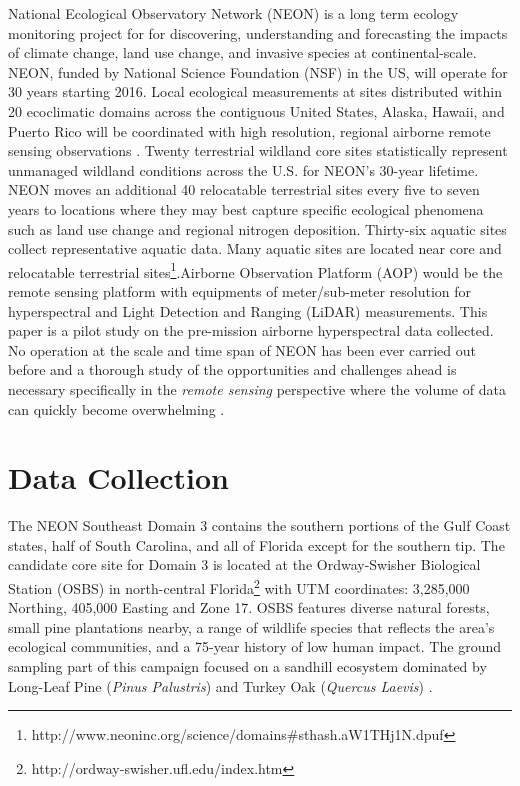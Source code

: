\documentclass[remotesensing,article,accept,moreauthors,pdftex,12pt,a4paper]{mdpi}
\begin{document}
National Ecological Observatory Network (NEON) is a long term ecology monitoring project for for discovering, understanding and forecasting the impacts of climate change, land use change, and invasive species at continental-scale. NEON, funded by National Science Foundation (NSF) in the US, will operate for 30 years starting 2016. Local ecological measurements at sites distributed within 20 ecoclimatic domains across the contiguous United States, Alaska, Hawaii, and Puerto Rico will be coordinated with high resolution, regional airborne remote sensing observations \cite{kampe2010neon}. Twenty terrestrial wildland core sites statistically represent unmanaged wildland conditions across the U.S. for NEON's 30-year lifetime. NEON moves an additional 40 relocatable terrestrial sites every five to seven years to locations where they may best capture specific ecological phenomena such as land use change and regional nitrogen deposition. Thirty-six aquatic sites collect representative aquatic data. Many aquatic sites are located near core and relocatable terrestrial sites\footnote{http://www.neoninc.org/science/domains\#sthash.aW1THj1N.dpuf}.Airborne Observation Platform (AOP) would be the remote sensing platform with equipments of meter/sub-meter resolution for hyperspectral and Light Detection and Ranging (LiDAR) measurements. This paper is a pilot study on the pre-mission airborne hyperspectral data collected. No operation at the scale and time span of NEON has been ever carried out before and a thorough study of the opportunities and challenges ahead is necessary specifically in the \textit{remote sensing} perspective where the volume of data can quickly become overwhelming \cite{neon2010aop}.

\section{Data Collection}

The NEON Southeast Domain 3 contains the southern portions of the Gulf Coast states, half of South Carolina, and all of Florida except for the southern tip. The candidate core site for Domain 3 is located at the Ordway-Swisher Biological Station (OSBS) in north-central Florida\footnote{http://ordway-swisher.ufl.edu/index.htm} with UTM coordinates: 3,285,000 Northing, 405,000 Easting and Zone 17. OSBS features diverse natural forests, small pine plantations nearby, a range of wildlife species that reflects the area's ecological communities, and a 75-year history of low human impact. The ground sampling part of this campaign focused on a sandhill ecosystem dominated by Long-Leaf Pine (\textit{Pinus Palustris}) and Turkey Oak (\textit{Quercus Laevis}) \cite{neon2010aop}.
\end{document}
